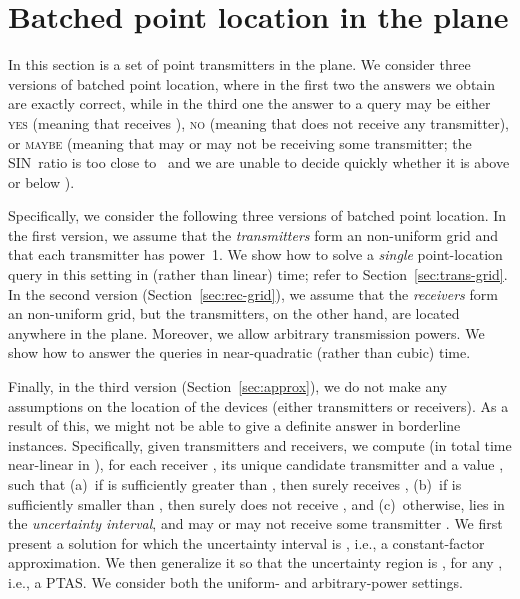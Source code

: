 \documentclass[11pt]{article}
\theoremstyle{remark}
\begin{document}
\section{Batched point location in the plane}
\label{sec:2d}

In this section  is a set of  point transmitters in the plane.
We consider three versions of batched point location, where in the
first two the answers we obtain are exactly correct, while in the
third one the answer to a query  may be either \textsc{yes} (meaning
that  receives ), \textsc{no} (meaning that  does not receive any
transmitter), or \textsc{maybe} (meaning that  may or may not be receiving some 
transmitter; the SIN~ratio is too close to~ and we are unable to decide quickly whether it is above or below ).   

Specifically, we consider the following three versions of batched point location.
In the first version, we assume that the \emph{transmitters} form an  non-uniform grid and
that each transmitter has power~1. We show how to solve a \emph{single} point-location query in this setting
in  (rather than linear) time; refer to Section~\ref{sec:trans-grid}.
In the second version (Section~\ref{sec:rec-grid}),  
we assume that the \emph{receivers} form an  non-uniform grid, but
the  transmitters, on the other hand, are located anywhere in the plane.
Moreover, we allow arbitrary transmission powers.
We show how to answer the  queries in near-quadratic (rather than cubic) time.

Finally, in the third version (Section~\ref{sec:approx}), we do not make any assumptions on the location of the devices (either transmitters or receivers). As a result of this, we might not be able to give a definite answer in borderline instances. Specifically, given  transmitters and  receivers, we compute (in total time near-linear in ), for each receiver , its unique candidate transmitter  and a value , such that (a)~if  is sufficiently greater than , then  surely receives , (b)~if  is sufficiently smaller than , then  surely does not receive , and (c)~otherwise,  lies in the \emph{uncertainty interval}, and  may or may not receive some transmitter . 
We first present a solution for which the uncertainty interval is , i.e., a constant-factor approximation. We then generalize it so that the uncertainty region is , for any , i.e., a PTAS.
We consider both the uniform- and arbitrary-power settings.

 
\end{document}
